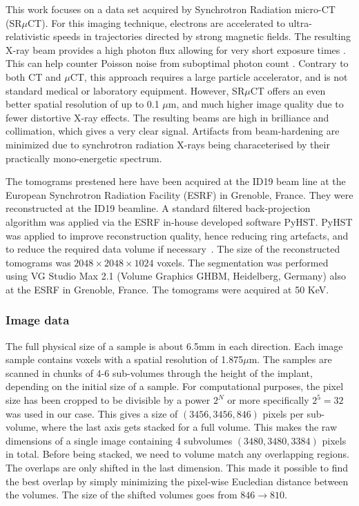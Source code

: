 This work focuses on a data set acquired by Synchrotron Radiation micro-CT (SR$\mu$CT). For this
imaging technique, electrons are accelerated to ultra-relativistic speeds in trajectories directed
by strong magnetic fields. The resulting X-ray beam provides a high photon flux allowing for very
short exposure times \citep{srexptime}. This can help counter Poisson noise from suboptimal photon
count \citep{srnoise}. Contrary to both CT and $\mu$CT, this approach requires a large particle
accelerator, and is not standard medical or laboratory equipment. However, SR$\mu$CT  offers an
even better spatial resolution of up to 0.1 $\mu$m, and much higher image quality due to fewer
distortive X-ray effects. The resulting beams are high in brilliance and collimation, which gives
a very clear signal. Artifacts from beam-hardening are minimized due to synchrotron radiation
X-rays being characeterised by their practically mono-energetic spectrum.

The tomograms prestened here have been acquired at the ID19 beam line at the European Synchrotron
Radiation Facility (ESRF) in Grenoble, France. They were reconstructed\citep{sporring} at the
ID19 beamline. A standard filtered back-projection algorithm was applied via the ESRF in-house developed
software PyHST\citep{pyhst}. PyHST was applied to improve reconstruction quality, hence reducing ring
artefacts, and to reduce the required data volume if necessary~\cite{MIRONE201441}. The
size of the reconstructed tomograms was $2048 \times 2048 \times 1024$ voxels. The segmentation was
performed using VG Studio Max 2.1 (Volume Graphics GHBM, Heidelberg, Germany) also at the ESRF in
Grenoble, France. The tomograms were acquired at 50 KeV.

\subsubsection{Image data}

The full physical size of a sample is about 6.5mm in each direction. Each image sample contains
voxels with a spatial resolution of 1.875$\mu$m. The samples are scanned in chunks of 4-6
sub-volumes through the height of the implant, depending on the initial size of a sample.
For computational purposes, the pixel size has been cropped to be divisible by a power $2^N$ or
more specifically $2^5=32$ was used in our case. This gives a size of $(3456,3456,846)$ pixels
per sub-volume, where the last axis gets stacked for a full volume. This makes the raw dimensions
of a single image containing 4 subvolumes $(3480,3480,3384)$ pixels in total. Before being stacked,
we need to volume match any overlapping regions. The overlaps are only shifted in the last dimension.
This made it possible to find the best overlap by simply minimizing the pixel-wise Eucledian distance
between the volumes. The size of the shifted volumes goes from $846 \rightarrow 810$.

